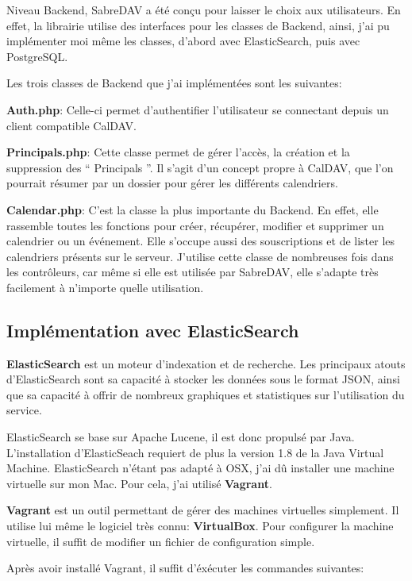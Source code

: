 Niveau Backend, SabreDAV a été conçu pour laisser le choix aux utilisateurs. En effet, la librairie utilise des interfaces pour les classes de Backend, ainsi, j'ai pu implémenter moi même les classes, d'abord avec ElasticSearch, puis avec PostgreSQL.

Les trois classes de Backend que j'ai implémentées sont les suivantes:

\textbf{Auth.php}: Celle-ci permet d'authentifier l'utilisateur se connectant depuis un client compatible CalDAV.

\textbf{Principals.php}: Cette classe permet de gérer l'accès, la création et la suppression des `` Principals ''. Il s'agit d'un concept propre à CalDAV, que l'on pourrait résumer par un dossier pour gérer les différents calendriers.

\textbf{Calendar.php}: C'est la classe la plus importante du Backend. En effet, elle rassemble toutes les fonctions pour créer, récupérer, modifier et supprimer un calendrier ou un événement. Elle s'occupe aussi des souscriptions et de lister les calendriers présents sur le serveur. J'utilise cette classe de nombreuses fois dans les contrôleurs, car même si elle est utilisée par SabreDAV, elle s'adapte très facilement à n'importe quelle utilisation.

\subsection{Implémentation avec ElasticSearch}

\textbf{ElasticSearch} est un moteur d'indexation et de recherche. Les principaux atouts d'ElasticSearch sont sa capacité à stocker les données sous le format JSON, ainsi que sa capacité à offrir de nombreux graphiques et statistiques sur l'utilisation du service.

ElasticSearch se base sur Apache Lucene, il est donc propulsé par Java. L'installation d'ElasticSeach requiert de plus la version 1.8 de la Java Virtual Machine. ElasticSearch n'étant pas adapté à OSX, j'ai dû installer une machine virtuelle sur mon Mac. Pour cela, j'ai utilisé \textbf{Vagrant}.

\textbf{Vagrant} est un outil permettant de gérer des machines virtuelles simplement. Il utilise lui même le logiciel très connu: \textbf{VirtualBox}. Pour configurer la machine virtuelle, il suffit de modifier un fichier de configuration simple.

Après avoir installé Vagrant, il suffit d'éxécuter les commandes suivantes:


